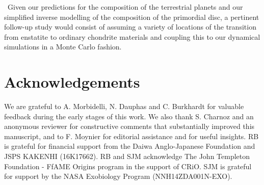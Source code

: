 \documentclass[preprint,5p,times,authoryear]{elsarticle}
\begin{document}
{\ Given our predictions for the composition of the terrestrial planets and our simplified inverse modelling of the composition of 
the primordial disc, a pertinent follow-up study would consist of assuming a variety of locations of the transition from enstatite 
to ordinary chondrite materials and coupling this to our dynamical simulations in a Monte Carlo fashion.}

\section{Acknowledgements}
We are grateful to A. Morbidelli, N. Dauphas and C. Burkhardt for valuable feedback during the early stages of this work. 
We also thank S. Charnoz and an anonymous reviewer for constructive comments that substantially improved this manuscript, and to 
F. Moynier for editorial assistance and for useful insights. RB is grateful for financial support from the Daiwa Anglo-Japanese 
Foundation and JSPS KAKENHI (16K17662). RB and SJM acknowledge The John Templeton Foundation - FfAME Origins program in the support of 
CRiO. SJM is grateful for support by the NASA Exobiology Program (NNH14ZDA001N-EXO).
\end{document}

